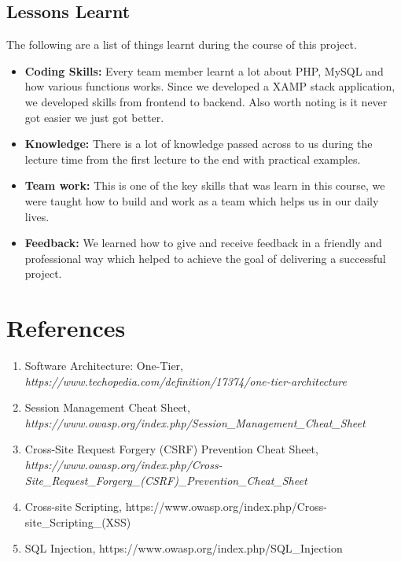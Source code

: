 \documentclass[12pt,a4paper]{article}
\begin{document}
	\subsection{Lessons Learnt}
	\begin{flushleft}
		The following are a list of things learnt during the course of this project.
		\begin{itemize}
		\item \textbf{Coding Skills:} Every team member learnt a lot about PHP, MySQL and how various functions works. Since we developed a XAMP stack application, we developed skills from frontend to backend. Also worth noting is it never got easier we just got better.
		\item \textbf{Knowledge:} There is a lot of knowledge passed across to us during the lecture time from the first lecture to the end with practical examples.
		\item \textbf{Team work:} This is one of the key skills that was learn in this course, we were taught how to build and work as a
		team which helps us in our daily lives.
		\item \textbf{Feedback:} We learned how to give and receive feedback in a friendly and professional way which helped to achieve the goal of delivering a successful project.
		\end{itemize}
	\end{flushleft}
	
	\section{References}
	
	\begin{enumerate}
		\item Software Architecture: One-Tier, \textit{https://www.techopedia.com/definition/17374/one-tier-architecture}
		\item Session Management Cheat Sheet, \textit{https://www.owasp.org/index.php/Session\_Management\_Cheat\_Sheet}
		\item Cross-Site Request Forgery (CSRF) Prevention Cheat Sheet, \textit{https://www.owasp.org/index.php/Cross-Site\_Request\_Forgery\_(CSRF)\_Prevention\_Cheat\_Sheet}
		\item Cross-site Scripting, https://www.owasp.org/index.php/Cross-site\_Scripting\_(XSS)
		\item SQL Injection, https://www.owasp.org/index.php/SQL\_Injection
	\end{enumerate}
	
		
	
\end{document}
